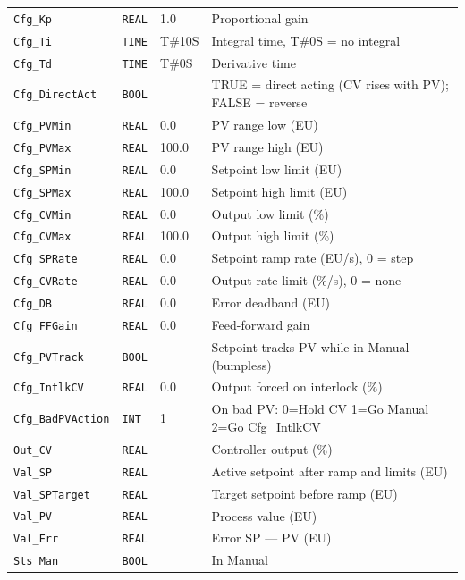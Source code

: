 \begin{small}
\begin{longtable}{@{}P{3.70cm}P{2.20cm}P{1.70cm}P{8.91cm}@{}}
\texttt{Cfg\_Kp} & \texttt{REAL} & 1.0 & Proportional gain \\
\texttt{Cfg\_Ti} & \texttt{TIME} & T\#10S & Integral time, T\#0S = no integral \\
\texttt{Cfg\_Td} & \texttt{TIME} & T\#0S & Derivative time \\
\texttt{Cfg\_DirectAct} & \texttt{BOOL} &  & TRUE = direct acting (CV rises with PV); FALSE = reverse \\
\texttt{Cfg\_PVMin} & \texttt{REAL} & 0.0 & PV range low (EU) \\
\texttt{Cfg\_PVMax} & \texttt{REAL} & 100.0 & PV range high (EU) \\
\texttt{Cfg\_SPMin} & \texttt{REAL} & 0.0 & Setpoint low limit (EU) \\
\texttt{Cfg\_SPMax} & \texttt{REAL} & 100.0 & Setpoint high limit (EU) \\
\texttt{Cfg\_CVMin} & \texttt{REAL} & 0.0 & Output low limit (\%) \\
\texttt{Cfg\_CVMax} & \texttt{REAL} & 100.0 & Output high limit (\%) \\
\texttt{Cfg\_SPRate} & \texttt{REAL} & 0.0 & Setpoint ramp rate (EU/\allowbreak{}s), 0 = step \\
\texttt{Cfg\_CVRate} & \texttt{REAL} & 0.0 & Output rate limit (\%/\allowbreak{}s), 0 = none \\
\texttt{Cfg\_DB} & \texttt{REAL} & 0.0 & Error deadband (EU) \\
\texttt{Cfg\_FFGain} & \texttt{REAL} & 0.0 & Feed-forward gain \\
\texttt{Cfg\_PVTrack} & \texttt{BOOL} &  & Setpoint tracks PV while in Manual (bumpless) \\
\texttt{Cfg\_IntlkCV} & \texttt{REAL} & 0.0 & Output forced on interlock (\%) \\
\texttt{Cfg\_BadPVAction} & \texttt{INT} & 1 & On bad PV: 0=Hold CV 1=Go Manual 2=Go Cfg\_IntlkCV \\
\texttt{Out\_CV} & \texttt{REAL} &  & Controller output (\%) \\
\texttt{Val\_SP} & \texttt{REAL} &  & Active setpoint after ramp and limits (EU) \\
\texttt{Val\_SPTarget} & \texttt{REAL} &  & Target setpoint before ramp (EU) \\
\texttt{Val\_PV} & \texttt{REAL} &  & Process value (EU) \\
\texttt{Val\_Err} & \texttt{REAL} &  & Error SP --- PV (EU) \\
\texttt{Sts\_Man} & \texttt{BOOL} &  & In Manual \\

\end{longtable}
\end{small}
